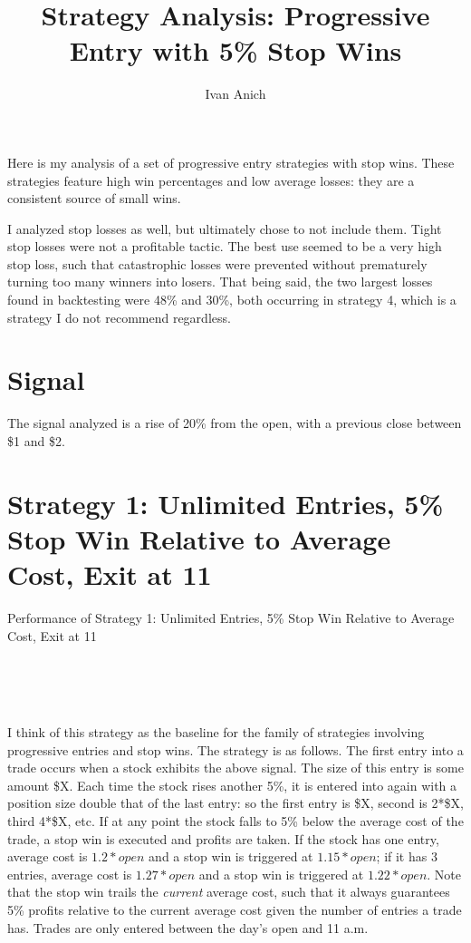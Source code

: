 \documentclass{article}
\title{Strategy Analysis: Progressive Entry with 5\% Stop Wins}
\author{Ivan Anich}
\begin{document}
\maketitle

Here is my analysis of a set of progressive entry strategies with stop wins. These strategies feature high win percentages and low average losses: they are a consistent source of small wins. 

I analyzed stop losses as well, but ultimately chose to not include them. Tight stop losses were not a profitable tactic. The best use seemed to be a very high stop loss, such that catastrophic losses were prevented without prematurely turning too many winners into losers. That being said, the two largest losses found in backtesting were 48\% and 30\%, both occurring in strategy 4, which is a strategy I do not recommend regardless.

\section{Signal}

The signal analyzed is a rise of 20\% from the open, with a previous close between \$1 and \$2. 

\section{Strategy 1: Unlimited Entries, 5\% Stop Win Relative to Average Cost, Exit at 11}

\begin{table}
\caption{Performance of Strategy 1: Unlimited Entries, 5\% Stop Win Relative to Average Cost, Exit at 11}
\\[2ex]


\\[2ex]


\\[2ex]

\label{tab_strat_1}
\end{table}

I think of this strategy as the baseline for the family of strategies involving progressive entries and stop wins. The strategy is as follows. The first entry into a trade occurs when a stock exhibits the above signal. The size of this entry is some amount \$X. Each time the stock rises another 5\%, it is entered into again with a position size double that of the last entry: so the first entry is \$X, second is 2*\$X, third 4*\$X, etc. If at any point the stock falls to 5\% below the average cost of the trade, a stop win is executed and profits are taken. If the stock has one entry, average cost is \(1.2*open\) and a stop win is triggered at \(1.15*open\); if it has 3 entries, average cost is \(1.27*open\) and a stop win is triggered at \(1.22*open\). Note that the stop win trails the \textit{current} average cost, such that it always guarantees 5\% profits relative to the current average cost given the number of entries a trade has. Trades are only entered between the day's open and 11 a.m.
\end{document}
